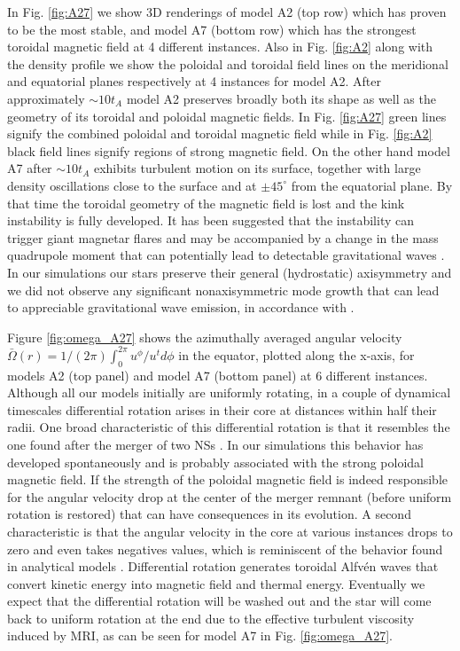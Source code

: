 \documentclass[twocolumn,superscriptaddress,showpacs,prl,aps,amsmath,amssymb,nofootinbib]{revtex4-1}
\begin{document}
In Fig. \ref{fig:A27} we show 3D renderings of model A2 (top row) which has
proven to be the most stable, and model A7 (bottom row) which has the strongest
toroidal magnetic field at 4 different instances.  Also in Fig. \ref{fig:A2}
along with the density profile we show  the poloidal and toroidal field lines
on the meridional and equatorial planes respectively at 4 instances for model
A2. After approximately $\sim 10 t_A$ model A2 preserves broadly both its shape
as well as the geometry of its toroidal and poloidal magnetic fields. In  Fig.
\ref{fig:A27} green lines signify the combined poloidal and toroidal magnetic
field while in Fig. \ref{fig:A2} black field lines signify regions of
strong magnetic field. On the other hand model A7 after  $\sim 10 t_A$ exhibits
turbulent motion on its surface, together with large density oscillations close
to the surface and at $\pm 45^\circ$ from the equatorial plane. By that time
the toroidal geometry of the magnetic field is lost and the kink instability is
fully developed. It has been suggested that the instability can trigger 
giant magnetar flares \cite{ThompsonDuncan1996} and may be accompanied by a
change in the mass quadrupole moment that can potentially lead to detectable
gravitational waves \cite{PhysRevD.83.104014,PhysRevD.83.081302}. In our 
simulations our stars preserve their general (hydrostatic) axisymmetry
and we did not observe any significant nonaxisymmetric mode growth that can
lead to appreciable gravitational wave emission, in accordance with 
\cite{Ciolfi2012,Zink2012,Lasky2012}.

Figure \ref{fig:omega_A27} shows the azimuthally averaged angular velocity
$\bar{\Omega}(r)=1/(2\pi)\int_0^{2\pi}u^\phi/u^t d\phi$ in the equator, plotted
along the x-axis, for models A2 (top panel) and model A7 (bottom panel) at 6
different instances.  Although all our models initially are uniformly rotating,
in a couple of dynamical timescales differential rotation arises in their core
at distances within half their radii. One broad characteristic of this
differential rotation is that it resembles the one found after the merger of
two NSs \cite{Uryu:2017obi,Kastaun:2014fna,Hanauske:2016gia,Ruiz:2021qmm}. In
our simulations this behavior has developed spontaneously and is probably
associated with the strong poloidal magnetic field. If the strength of the
poloidal magnetic field is indeed responsible for the angular velocity drop at
the center of the merger remnant (before uniform rotation is restored) that can
have consequences in its evolution.  A second characteristic is that the
angular velocity in the core at various instances drops to zero and even takes
negatives values, which is reminiscent of the behavior found in analytical
models \cite{Shapiro:2000zh}.  Differential rotation generates toroidal
Alfv\'en waves that convert kinetic energy into magnetic field and thermal
\cite{Cook:2003ku} energy. Eventually we expect that the differential rotation
will be washed out and the star will come back to uniform rotation at the end
due to the effective turbulent viscosity induced by MRI, as can be seen for
model A7 in Fig. \ref{fig:omega_A27}.
\end{document}
